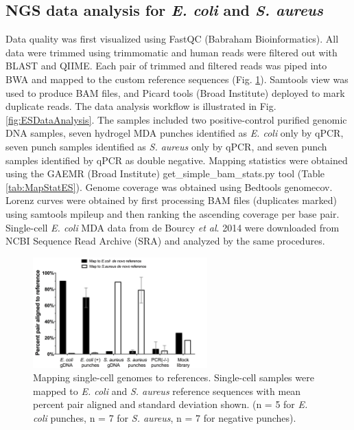 \subsection{NGS data analysis for \textit{E. coli} and \textit{S. aureus}}
Data quality was first visualized using FastQC (Babraham Bioinformatics). All data were trimmed using trimmomatic \cite{Bolger:2014ek} and human reads were filtered out with BLAST and QIIME. Each pair of trimmed and filtered reads was piped into BWA and mapped to the custom reference sequences (Fig. \ref{fig:MappingES}). Samtools view was used to produce BAM files, and Picard tools (Broad Institute) deployed to mark duplicate reads. The data analysis workflow is illustrated in Fig. \ref{fig:ESDataAnalysis}. The samples included two positive-control purified genomic DNA samples, seven hydrogel MDA punches identified as \textit{E. coli} only by qPCR, seven punch samples identified as \textit{S. aureus} only by qPCR, and seven punch samples identified by qPCR as double negative. Mapping statistics were obtained using the GAEMR (Broad Institute) get\_simple\_bam\_stats.py tool (Table \ref{tab:MapStatES}). Genome coverage was obtained using Bedtools genomecov. Lorenz curves were obtained by first processing BAM files (duplicates marked) using samtools mpileup and then ranking the ascending coverage per base pair. Single-cell \textit{E. coli} MDA data from de Bourcy \textit{et al}. 2014 were downloaded from NCBI Sequence Read Archive (SRA) and analyzed by the same procedures. 

\begin{figure}
\centering
\includegraphics[keepaspectratio,width=0.6\textwidth]{./figures/SuppFig7.jpg}
\caption[Mapping single-cell genomes to references]{Mapping single-cell genomes to references. Single-cell samples were mapped to \textit{E. coli} and \textit{S. aureus} reference sequences with mean percent pair aligned and standard deviation shown. (n = 5 for \textit{E. coli} punches, n = 7 for \textit{S. aureus}, n = 7 for negative punches).}
\label{fig:MappingES}
\end{figure}

